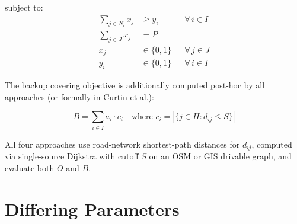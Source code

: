 \documentclass[12pt]{article}
\begin{document}
\noindent subject to:
\begin{align}
    \sum_{j \in N_i} x_j &\ge y_i  && \forall\, i \in I \label{eq:cov}\\
    \sum_{j \in J}   x_j &=  P     && \label{eq:card}\\
    x_j &\in \{0,1\}               && \forall\, j \in J \label{eq:xbin}\\
    y_i &\in \{0,1\}               && \forall\, i \in I \label{eq:ybin}
\end{align}

\noindent The backup covering objective is additionally computed post-hoc by
all approaches (or formally in Curtin et al.):

\begin{equation}
    B = \sum_{i \in I} a_i \cdot c_i
    \quad \text{where } c_i = |\{j \in H : d_{ij} \le S\}|
    \label{eq:backup}
\end{equation}

\noindent All four approaches use road-network shortest-path distances for
$d_{ij}$, computed via single-source Dijkstra with cutoff $S$ on an OSM
or GIS drivable graph, and evaluate both $O$ and $B$.

\section{Differing Parameters}
\end{document}
